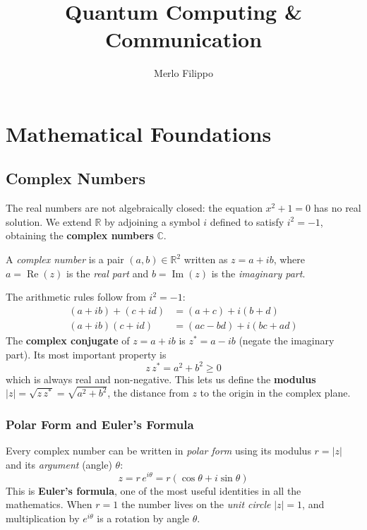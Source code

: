 \documentclass[oneside]{academica}
\title{Quantum Computing \& Communication}
\author{Merlo Filippo}
\begin{document}
\frontmatter
\maketitle
\tableofcontents
\mainmatter

\chapter{Mathematical Foundations}

\section{Complex Numbers}

The real numbers are not algebraically closed: the equation $x^2+1=0$ has no real solution.
We extend $\mathbb{R}$ by adjoining a symbol $i$ defined to satisfy $i^2 = -1$, obtaining the \textbf{complex numbers} $\mathbb{C}$.

\begin{definition*}
  A \emph{complex number} is a pair $(a,b)\in\mathbb{R}^2$ written as $z = a + ib$, where $a = \operatorname{Re}(z)$ is the \emph{real part} and $b = \operatorname{Im}(z)$ is the \emph{imaginary part}.
\end{definition*}

The arithmetic rules follow from $i^2=-1$:
\begin{align*}
  (a+ib)+(c+id) &= (a+c)+i(b+d) \\
  (a+ib)(c+id)  &= (ac-bd)+i(bc+ad)
\end{align*}
The \textbf{complex conjugate} of $z=a+ib$ is $z^*=a-ib$ (negate the imaginary part).
Its most important property is
\begin{equation*}
  z\,z^* = a^2+b^2 \ge 0
\end{equation*}
which is always real and non-negative.
This lets us define the \textbf{modulus} $|z|=\sqrt{z\,z^*}=\sqrt{a^2+b^2}$, the distance from $z$ to the origin in the complex plane.

\subsection{Polar Form and Euler's Formula}

Every complex number can be written in \emph{polar form} using its modulus $r=|z|$ and its \emph{argument} (angle) $\theta$:
\begin{equation*}
  z = r\,e^{i\theta} = r(\cos\theta + i\sin\theta)
\end{equation*}
This is \textbf{Euler's formula}, one of the most useful identities in all the mathematics.
When $r=1$ the number lives on the \emph{unit circle} $|z|=1$, and multiplication by $e^{i\theta}$ is a rotation by angle $\theta$.
\end{document}
